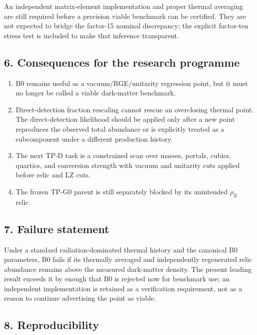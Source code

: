 \documentclass[
]{article}
\providecommand{\tightlist}{%
  \setlength{\itemsep}{0pt}\setlength{\parskip}{0pt}}
\begin{document}
An independent matrix-element implementation and proper thermal
averaging are still required before a precision viable benchmark can be
certified. They are not expected to bridge the factor-15 nominal
discrepancy; the explicit factor-ten stress test is included to make
that inference transparent.

\hypertarget{consequences-for-the-research-programme}{%
\subsection{6. Consequences for the research
programme}\label{consequences-for-the-research-programme}}

\begin{enumerate}
\def\labelenumi{\arabic{enumi}.}
\tightlist
\item
  B0 remains useful as a vacuum/RGE/unitarity regression point, but it
  must no longer be called a viable dark-matter benchmark.
\item
  Direct-detection fraction rescaling cannot rescue an overclosing
  thermal point. The direct-detection likelihood should be applied only
  after a new point reproduces the observed total abundance or is
  explicitly treated as a subcomponent under a different production
  history.
\item
  The next TP-D task is a constrained scan over masses, portals, cubics,
  quartics, and conversion strength with vacuum and unitarity cuts
  applied before relic and LZ cuts.
\item
  The frozen TP-G0 parent is still separately blocked by its unintended
  \(\rho_E\) relic.
\end{enumerate}

\hypertarget{failure-statement}{%
\subsection{7. Failure statement}\label{failure-statement}}

Under a standard radiation-dominated thermal history and the canonical
B0 parameters, B0 fails if its thermally averaged and independently
regenerated relic abundance remains above the measured dark-matter
density. The present leading result exceeds it by enough that B0 is
rejected now for benchmark use; an independent implementation is
retained as a verification requirement, not as a reason to continue
advertising the point as viable.

\hypertarget{reproducibility-4}{%
\subsection{8. Reproducibility}\label{reproducibility-4}}
\end{document}
